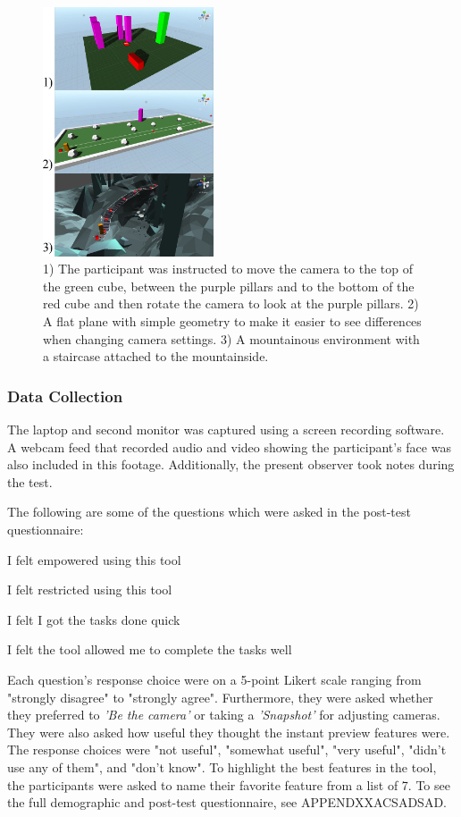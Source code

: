 \begin{figure}[htbp]
\centering
\includegraphics[width=0.45\textwidth]{Pics/sceneAll}
\caption{1) The participant was instructed to move the camera to the top of the green cube, between the purple pillars and to the bottom of the red cube and then rotate the camera to look at the purple pillars. 2) A flat plane with simple geometry to make it easier to see differences when changing camera settings. 3) A mountainous environment with a staircase attached to the mountainside.}
\label{fig:sceneAll}
\end{figure}

\subsubsection{Data Collection}
The laptop and second monitor was captured using a screen recording software. A webcam feed  that recorded audio and video showing the participant's face was also included in this footage. Additionally, the present observer took notes during the test.

The following are some of the questions which were asked in the post-test questionnaire:

\setlength{\parindent}{1cm}
I felt empowered using this tool

\setlength{\parskip}{0pt}
I felt restricted using this tool

I felt I got the tasks done quick

I felt the tool allowed me to complete the tasks well

\setlength{\parskip}{15pt}
\noindent
Each question's response choice were on a 5-point Likert scale ranging from "strongly disagree" to "strongly agree". Furthermore, they were asked whether they preferred to \textit{'Be the camera'} or taking a \textit{'Snapshot'} for adjusting cameras. They were also asked how useful they thought the instant preview features were. The response choices were "not useful", "somewhat useful", "very useful", "didn't use any of them", and "don't know". To highlight the best features in the tool, the participants were asked to name their favorite feature from a list of 7. To see the full demographic and post-test questionnaire, see APPENDXXACSADSAD. 

